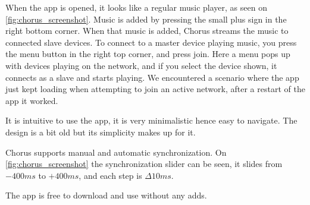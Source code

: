 When the app is opened, it looks like a regular music player, as seen on \cref{fig:chorus_screenshot}.
Music is added by pressing the small plus sign in the right bottom corner. 
When that music is added, Chorus streams the music to connected slave devices.
To connect to a master device playing music, you press the menu button in the right top corner, and press join.
Here a menu pops up with devices playing on the network, and if you select the device shown, it connects as a slave and starts playing.
We encountered a scenario where the app just kept loading when attempting to join an active network, after a restart of the app it worked.

It is intuitive to use the app, it is very minimalistic hence easy to navigate.
The design is a bit old but its simplicity makes up for it.

Chorus supports manual and automatic synchronization.
On \cref{fig:chorus_screenshot} the synchronization slider can be seen,
it slides from $-400ms$ to $+400ms$, and each step is $\Delta 10ms$.

The app is free to download and use without any adds.\cite{chrous_play} 

